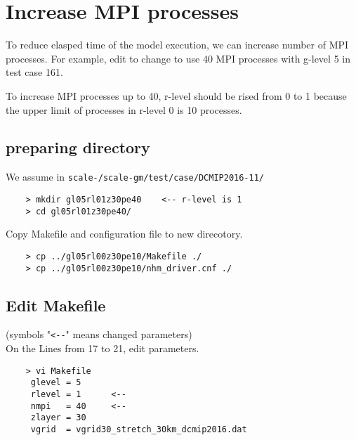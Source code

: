 \section{Increase MPI processes}
 \noindent To reduce elasped time of the model execution, we can increase
 number of MPI processes. For example, edit to change to use 40 MPI processes
 with g-level 5 in test case 161.

 To increase MPI processes up to 40, r-level should be rised from 0 to 1
 because the upper limit of processes in r-level 0 is 10 processes.

\subsection{preparing directory}
 We assume in \texttt{scale-{\version}/scale-gm/test/case/DCMIP2016-11/}
 \begin{verbatim}
    > mkdir gl05rl01z30pe40    <-- r-level is 1
    > cd gl05rl01z30pe40/
 \end{verbatim}

 \noindent Copy Makefile and configuration file to new direcotory.
 \begin{verbatim}
    > cp ../gl05rl00z30pe10/Makefile ./
    > cp ../gl05rl00z30pe10/nhm_driver.cnf ./
 \end{verbatim}

\subsection{Edit Makefile}
 (symbols "\verb|<--|" means changed parameters) \\
 On the Lines from 17 to 21, edit parameters.
 \begin{verbatim}
    > vi Makefile
     glevel = 5
     rlevel = 1      <--
     nmpi   = 40     <--
     zlayer = 30
     vgrid  = vgrid30_stretch_30km_dcmip2016.dat
 \end{verbatim}


